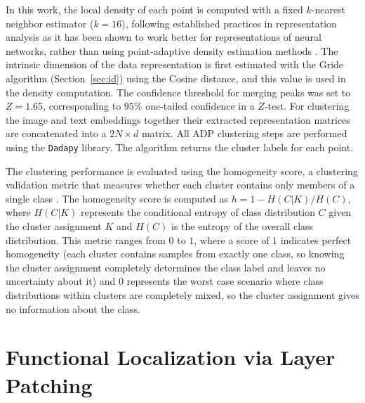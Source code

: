 In this work, the local density of each point is computed with a fixed $k$-nearest neighbor estimator ($k=16$), following established practices in representation analysis \cite{doimoHierarchicalNucleationDeep2020, doimoRepresentationLandscapeFewShot, serraNarrowGateLocalizeda} as it has been shown to work better for representations of neural networks, rather than using point-adaptive density estimation methods \cite{derricoAutomaticTopographyHighdimensional2021}. The intrinsic dimension of the data representation is first estimated with the Gride algorithm (Section~\ref{sec:id}) using the Cosine distance, and this value is used in the density computation. The confidence threshold for merging peaks was set to $Z=1.65$, corresponding to $95\%$ one-tailed confidence in a $Z$-test. For clustering the image and text embeddings together their extracted representation matrices are concatenated into a $2N\times d$ matrix. All ADP clustering steps are performed using the \texttt{Dadapy} library. The algorithm returns the cluster labels for each point.

The clustering performance is evaluated using the homogeneity score, a clustering validation metric that measures whether each cluster contains only members of a single class \cite{rosenbergVMeasureConditionalEntropyBased}. The homogeneity score is computed as $h = 1 - H(C|K)/H(C)$, where $H(C|K)$ represents the conditional entropy of class distribution $C$ given the cluster assignment $K$ and $H(C)$ is the entropy of the overall class distribution. This metric ranges from $0$ to $1$, where a score of $1$ indicates perfect homogeneity (each cluster contains samples from exactly one class, so knowing the cluster assignment completely determines the class label and leaves no uncertainty about it) and $0$ represents the worst case scenario where class distributions within clusters are completely mixed, so the cluster assignment gives no information about the class.




\section{Functional Localization via Layer Patching}\label{sec:functional_localization_via_layer_patching}

